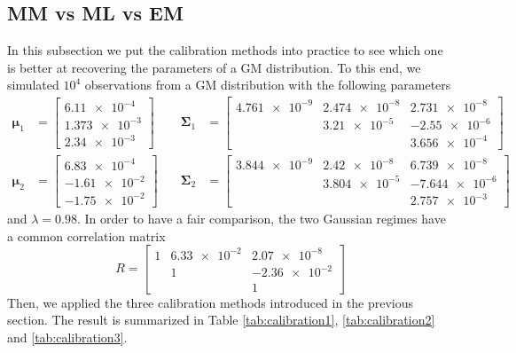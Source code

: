 \subsection{MM vs ML vs EM}
In this subsection we put the calibration methods into practice to see which one is better at recovering the parameters of a \gls{GM} distribution. To this end, we simulated $10^4$ observations from a \gls{GM} distribution with the following parameters
\begin{align*}
\bm{\mu}_1 & = 
\begin{bmatrix}
\num{6.11e-4} \\
\num{1.373e-3} \\  
\num{2.34e-3}
\end{bmatrix}
\quad & \bm{\Sigma}_1 &= 
\begin{bmatrix}
\num{4.761e-9} & \num{2.474e-8} & \num{2.731e-8} \\
               & \num{3.21e-5}  & \num{-2.55e-6} \\
               &                & \num{3.656e-4}
\end{bmatrix} \\
\bm{\mu}_2 & = \begin{bmatrix}
\num{6.83e-4} \\
\num{-1.61e-2} \\
\num{-1.75e-2}
\end{bmatrix}
\quad & \bm{\Sigma}_2 &= 
\begin{bmatrix}
\num{3.844e-9} & \num{2.42e-8} & \num{6.739e-8} \\
               & \num{3.804e-5}  & \num{-7.644e-6} \\
               &                & \num{2.757e-3}
\end{bmatrix}
\end{align*}
and $\lambda = 0.98$. In order to have a fair comparison, the two Gaussian regimes have a common correlation matrix \[ R = 
\begin{bmatrix}
\num{1} & \num{6.33e-2} & \num{2.07e-8} \\
        & \num{1}       & \num{-2.36e-2} \\
        &                & \num{1}
\end{bmatrix}\]
Then, we applied the three calibration methods introduced in the previous section. The result is summarized in Table \ref{tab:calibration1}, \ref{tab:calibration2} and \ref{tab:calibration3}.
